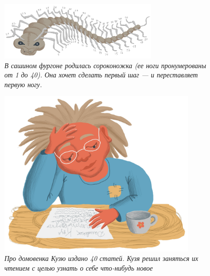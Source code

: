 \documentclass[10pt]{scrbook} \usepackage{modules/nonstahp_book}
\begin{document}
\begin{figure} \begin{center}
	\includegraphics[width=8cm]{figures/color/08c.jpg}
	\vspace{0.5cm}
	\caption{
             {\itshape  В сашином фургоне родилась сороконожка (ее ноги пронумерованы от 1 до 40). 
              Она хочет сделать первый шаг — и переставляет первую ногу. 
             }\medskip\\
             }
\end{center} \end{figure}

\begin{figure} \begin{center}
	\includegraphics[width=10cm]{figures/color/20c.jpg}
	\vspace{1cm}
	\caption{
             {\itshape Про домовенка Кузю издано 40 статей. 
             Кузя решил заняться их чтением с целью узнать о себе что-нибудь новое }\medskip\\
             }
\end{center} \end{figure}
\end{document}
